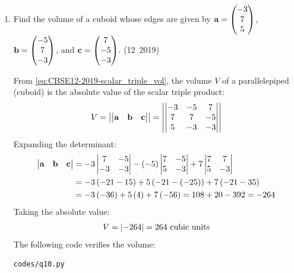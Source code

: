\begin{enumerate}[label=\thesubsection.\arabic*, ref=\thesubsection.\theenumi]
\solution
Let $\theta$ be the angle between $\vec{a}$ and $\vec{b}$.
Evaluating the magnitude of $\vec{a} \times \vec{b}$:
\begin{align}
	\norm{\vec{a} \times \vec{b}} = \sqrt{3^2 + 2^2 + 6^2} = \sqrt{9 + 4 + 36} = \sqrt{49} = 7
\end{align}
From \eqref{eq:CBSE12-2019-cross_norm} and \eqref{eq:CBSE12-2019-sin_theta}:
\begin{align}
	\sin\theta = \frac{\norm{\vec{a} \times \vec{b}}}{\norm{\vec{a}}\norm{\vec{b}}} = \frac{7}{2 \times 7} = \frac{1}{2}
\end{align}
Since $\theta \in [0, \pi]$:
\begin{align}
	\theta = \frac{\pi}{6} \quad \text{or} \quad \theta = \frac{5\pi}{6}
\end{align}


\item Find the volume of a cuboid whose edges are given by $\mathbf{a} = \begin{pmatrix}-3 \\ 7 \\ 5\end{pmatrix}$, $\mathbf{b} = \begin{pmatrix}-5 \\ 7 \\ -3\end{pmatrix}$, and $\mathbf{c} = \begin{pmatrix}7 \\ -5 \\ -3\end{pmatrix}$.
\hfill (12~2019)

\solution
From \eqref{eq:CBSE12-2019-scalar_triple_vol}, the volume $V$ of a parallelepiped (cuboid) is the absolute value of the scalar triple product:
\begin{align}
	V = \left\vert\begin{vmatrix}\mathbf{a} & \mathbf{b} & \mathbf{c}\end{vmatrix}\right\vert = \left\vert\begin{vmatrix}-3 & -5 & 7 \\ 7 & 7 & -5 \\ 5 & -3 & -3\end{vmatrix}\right\vert
\end{align}
Expanding the determinant:
\begin{align}
	\begin{vmatrix}\mathbf{a} & \mathbf{b} & \mathbf{c}\end{vmatrix} &= -3\begin{vmatrix}7 & -5 \\ -3 & -3\end{vmatrix} - \left(-5\right)\begin{vmatrix}7 & -5 \\ 5 & -3\end{vmatrix} + 7\begin{vmatrix}7 & 7 \\ 5 & -3\end{vmatrix} \\
	&= -3\left(-21 - 15\right) + 5\left(-21 - \left(-25\right)\right) + 7\left(-21 - 35\right) \\
	&= -3\left(-36\right) + 5\left(4\right) + 7\left(-56\right) = 108 + 20 - 392 = -264
\end{align}
Taking the absolute value:
\begin{align}
	V = \left\vert-264\right\vert = 264\text{ cubic units}
\end{align}
The following code verifies the volume:
\begin{lstlisting}[frame=single, basicstyle=\ttfamily\small]
	codes/q10.py
\end{lstlisting}



\end{enumerate}
